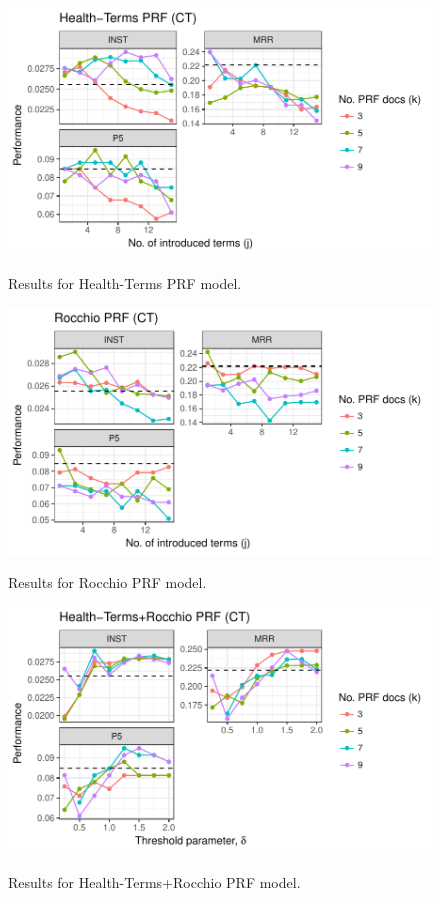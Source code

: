 \documentclass[a4paper]{report}
\begin{document}
\begin{figure}
\centering
\caption{Results for Health-Terms PRF model.}
\includegraphics[width=.9\columnwidth]{htprf.pdf}
\label{htprf_results}
\end{figure}

\begin{figure}
\centering
\caption{Results for Rocchio PRF model.}
\includegraphics[width=.9\columnwidth]{rocchioprf.pdf}
\label{rocchioprf_results}
\end{figure}

\begin{figure}
\centering
\caption{Results for Health-Terms+Rocchio PRF model.}
\includegraphics[width=.9\columnwidth]{ct-rocchiohtprf.pdf}
\label{rocchiohtprf_results}
\end{figure}
\end{document}

